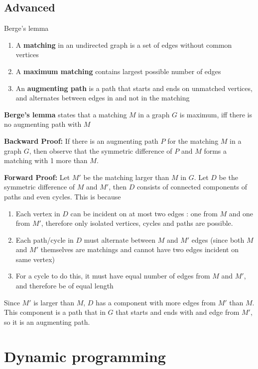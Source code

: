\documentclass[titlepage, 12pt]{book}
\begin{document}
\section{Advanced}

\begin{theorem}{Berge's lemma}{}
    \begin{enumerate}
        \item A \textbf{matching} in an undirected graph is a set of edges without
            common vertices
        \item A \textbf{maximum matching} contains largest possible number of edges
        \item An \textbf{augmenting path} is a path that starts and ends on
            unmatched vertices, and alternates between edges in and not in the
            matching
    \end{enumerate}
    \textbf{Berge's lemma} states that a matching $M$ in a graph $G$ is maximum,
    iff there is no augmenting path with $M$
\end{theorem}
\textbf{Backward Proof:}
If there is an augmenting path $P$ for the matching $M$ in a graph $G$, then
observe that the symmetric difference of $P$ and $M$ forms a matching with 1
more than $M$.

\textbf{Forward Proof:}
Let $M'$ be the matching larger than $M$ in $G$. Let $D$ be the symmetric
difference of $M$ and $M'$, then $D$ consists of connected components of paths
and even cycles. This is because

\begin{enumerate}
    \item Each vertex in $D$ can be incident on at most two edges : one from $M$
        and one from $M'$, therefore only isolated vertices, cycles and paths
        are possible.
    \item Each path/cycle in $D$ must alternate between $M$ and $M'$ edges
        (since both $M$ and $M'$ themselves are matchings and cannot have two
        edges incident on same vertex)
    \item For a cycle to do this, it must have equal number of edges from $M$
        and $M'$, and therefore be of equal length
\end{enumerate}
Since $M'$ is larger than $M$, $D$ has a component with more edges from $M'$
than $M$. This component is a path that in $G$ that starts and ends with and
edge from $M'$, so it is an augmenting path.

\chapter{Dynamic programming}
\end{document}
